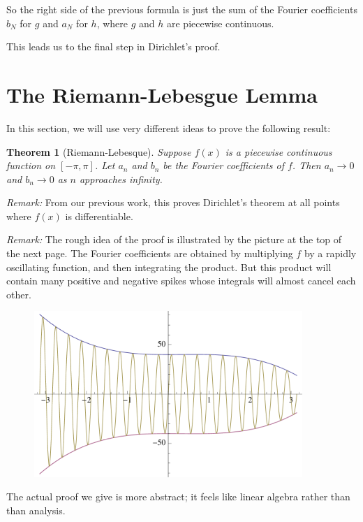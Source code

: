 \documentclass[11pt, oneside]{article}   	%
\newtheorem{theorem}{Theorem}
\begin{document}
So the right side of the previous formula is just the sum of the Fourier coefficients $b_N$ for $g$ and $a_N$ for $h$, where $g$ and $h$ are piecewise continuous.

This leads us to the final step in Dirichlet's proof. 

\section{The Riemann-Lebesgue Lemma}

In this section, we will use very different ideas to prove the following  result:

\begin{theorem}[Riemann-Lebesque]
Suppose $f(x)$ is a piecewise continuous function on $[- \pi, \pi]$. Let $a_n$ and $b_n$ be the Fourier coefficients of $f$. Then $a_n \rightarrow 0$ and $b_n \rightarrow 0$ as $n$ approaches infinity.
\end{theorem}

{\em Remark:} From our previous work, this proves Dirichlet's theorem at all points where $f(x)$ is differentiable.

{\em Remark:} The rough idea of the proof is illustrated by the picture at the top of the next page. The Fourier coefficients are obtained by multiplying $f$ by a rapidly oscillating function, and then integrating the product. But this product will contain many positive and negative spikes whose integrals will almost cancel each other.

\begin{figure}[htbp] %
   \centering
   \includegraphics[width=4in]{Graphics/five}
\end{figure}



The actual proof we give is more abstract; it feels  like linear algebra rather than than analysis.
\end{document}

